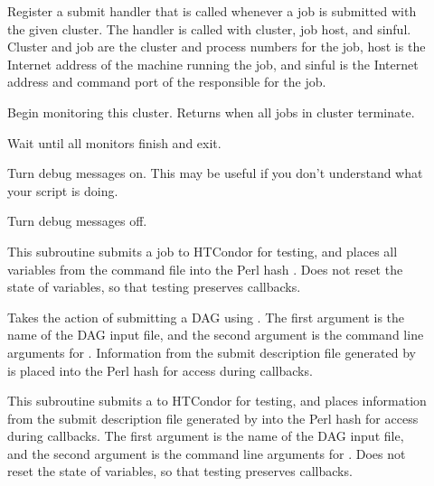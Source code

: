\begin{description}
	\item []
	Register a submit handler that is called whenever a job is submitted
	with the given cluster.  The handler is called with cluster, job 
	host, and sinful. Cluster and job are the cluster and
	process numbers for the job, host is the Internet address of the
	machine running the job, and sinful is the Internet address and
	command port of the  responsible for the job.

	\item []
	Begin monitoring this cluster. Returns when all jobs in cluster
	terminate.  \\
	
	\item []
	Wait until all monitors finish and exit.

	\item []
	Turn debug messages on.  This may be useful if you don't understand
	what your script is doing.	

	\item []
	Turn debug messages off.

  \item []
  This subroutine submits a job to HTCondor for testing, and places
  all variables from the command file into
  the Perl hash .
  Does not reset the state of variables, so that testing preserves
  callbacks.

  \item []
  Takes the action of submitting a DAG using .
  The first argument is the name of the DAG input file, 
  and the second argument is the command line arguments for 
  .
  Information from the submit description file generated by
   is placed into the Perl hash 
  for access during callbacks.

  \item []
  This subroutine submits a  to HTCondor for testing,
  and places information from the submit description file generated by
   into the Perl hash 
  for access during callbacks.
  The first argument is the name of the DAG input file, 
  and the second argument is the command line arguments for 
  .
  Does not reset the state of variables, so that testing preserves
  callbacks.


\end{description}
